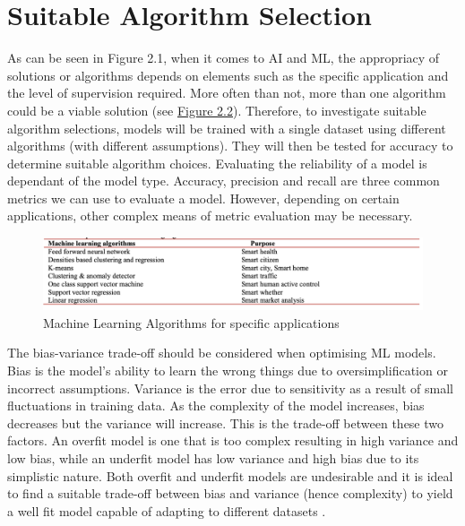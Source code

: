 \documentclass[a4paper,12pt]{report}
\begin{document}
\section{Suitable Algorithm Selection}
As can be seen in Figure 2.1, when it comes to AI and ML, the appropriacy of solutions or algorithms depends on elements such as the specific application and the level of supervision required. 
More often than not, more than one algorithm could be a viable solution (see \hyperref[fig:algor]{Figure 2.2}). 
Therefore, to investigate suitable algorithm selections, models will be trained with a single dataset using different algorithms (with different assumptions). 
They will then be tested for accuracy to determine suitable algorithm choices. Evaluating the reliability of a model is dependant of the model type. 
Accuracy, precision and recall are three common metrics we can use to evaluate a model. 
However, depending on certain applications, other complex means of metric evaluation may be necessary. 

\begin{figure}[h]
    \centering
    \includegraphics[width=1\textwidth]{ML_algorithms.png}
    \caption{Machine Learning Algorithms for specific applications \cite{Mohapatra}}
    \label{fig:applic}
\end{figure}

The bias-variance trade-off should be considered when optimising ML models. 
Bias is the model’s ability to learn the wrong things due to oversimplification or incorrect assumptions. 
Variance is the error due to sensitivity as a result of small fluctuations in training data. 
As the complexity of the model increases, bias decreases but the variance will increase. 
This is the trade-off between these two factors. 
An overfit model is one that is too complex resulting in high variance and low bias, while an underfit model has low variance and high bias due to its simplistic nature. 
Both overfit and underfit models are undesirable and it is ideal to find a suitable trade-off between bias and variance (hence complexity) to yield a well fit model capable of adapting to different datasets \cite{Jedamski}. 
\end{document}
